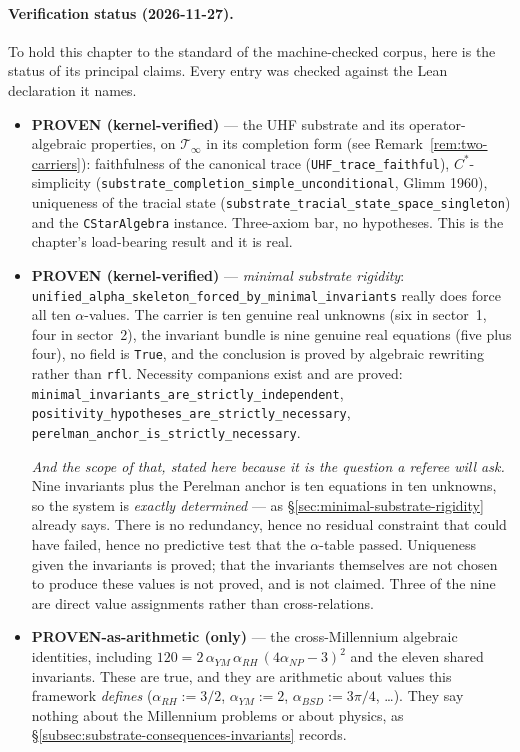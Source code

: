 \paragraph{Verification status (2026-11-27).}
To hold this chapter to the standard of the machine-checked corpus, here is the
status of its principal claims. Every entry was checked against the Lean
declaration it names.
\begin{itemize}

\item \textbf{PROVEN (kernel-verified)} --- the UHF substrate and its
operator-algebraic properties, on $\mathcal{T}_\infty$ in its completion form
(see Remark~\ref{rem:two-carriers}): faithfulness of the canonical trace
(\texttt{UHF\_trace\_faithful}), $C^*$-simplicity
(\texttt{substrate\_completion\_simple\_unconditional}, Glimm 1960), uniqueness
of the tracial state
(\texttt{substrate\_tracial\_state\_space\_singleton}) and the
\texttt{CStarAlgebra} instance. Three-axiom bar, no hypotheses. This is the
chapter's load-bearing result and it is real.

\item \textbf{PROVEN (kernel-verified)} --- \emph{minimal substrate rigidity}:
\texttt{unified\_alpha\_skeleton\_forced\_by\_minimal\_invariants} really does
force all ten $\alpha$-values. The carrier is ten genuine real unknowns (six in
sector~1, four in sector~2), the invariant bundle is nine genuine real
equations (five plus four), no field is \texttt{True}, and the conclusion is
proved by algebraic rewriting rather than \texttt{rfl}. Necessity companions
exist and are proved: \texttt{minimal\_invariants\_are\_strictly\_independent},
\texttt{positivity\_hypotheses\_are\_strictly\_necessary},
\texttt{perelman\_anchor\_is\_strictly\_necessary}.

\emph{And the scope of that, stated here because it is the question a referee
will ask.} Nine invariants plus the Perelman anchor is ten equations in ten
unknowns, so the system is \emph{exactly determined} --- as
\S\ref{sec:minimal-substrate-rigidity} already says. There is no redundancy,
hence no residual constraint that could have failed, hence no predictive test
that the $\alpha$-table passed. Uniqueness given the invariants is proved;
that the invariants themselves are not chosen to produce these values is not
proved, and is not claimed. Three of the nine are direct value assignments
rather than cross-relations.

\item \textbf{PROVEN-as-arithmetic (only)} --- the cross-Millennium algebraic
identities, including $120 = 2\,\alpha_{YM}\,\alpha_{RH}\,(4\alpha_{NP}-3)^2$
and the eleven shared invariants. These are true, and they are arithmetic about
values this framework \emph{defines} ($\alpha_{RH} := 3/2$, $\alpha_{YM} := 2$,
$\alpha_{BSD} := 3\pi/4$, \dots). They say nothing about the Millennium
problems or about physics, as
\S\ref{subsec:substrate-consequences-invariants} records.


\end{itemize}
